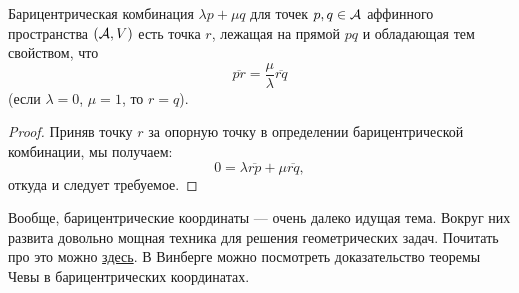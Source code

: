 \begin{proposal}
    Барицентрическая комбинация $\lambda p + \mu q$ для точек $p, q \in \mathcal{A}$ аффинного пространства $(\mathcal{A}, V)$ есть точка $r$, лежащая на прямой $pq$ и обладающая тем свойством, что
    \[
        \overline{pr} = \frac{\mu}{\lambda}\overline{rq}
    \]
    (если $\lambda = 0$, $\mu = 1$, то $r = q$).
\end{proposal}

\begin{proof}
    Приняв точку $r$ за опорную точку в определении барицентрической комбинации, мы получаем:
    \[
        0 = \lambda\overline{rp} + \mu\overline{rq},
    \]
    откуда и следует требуемое.
\end{proof}

Вообще, барицентрические координаты --- очень далеко идущая тема. Вокруг них развита довольно мощная техника для решения геометрических задач. Почитать про это можно \href{https://old.mccme.ru//mmmf-lectures//books/books/book.40.pdf}{здесь}. В Винберге можно посмотреть доказательство теоремы Чевы в барицентрических координатах.

